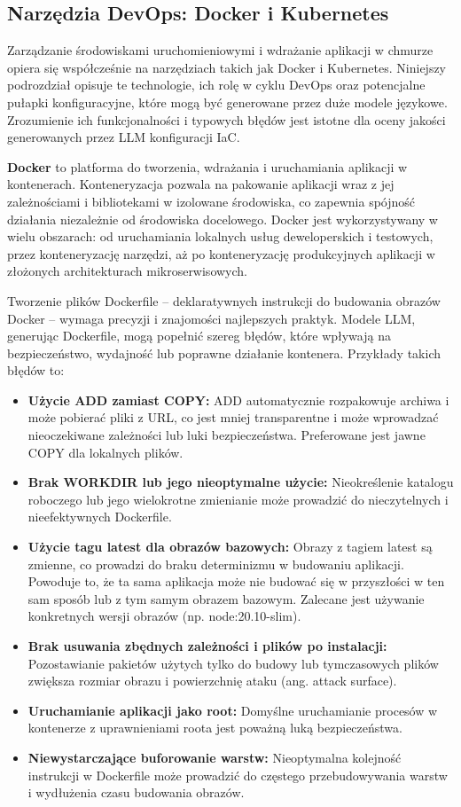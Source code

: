 \subsection{Narzędzia DevOps: Docker i Kubernetes}

Zarządzanie środowiskami uruchomieniowymi i wdrażanie aplikacji w chmurze opiera się współcześnie na narzędziach takich jak Docker i Kubernetes. Niniejszy podrozdział opisuje te technologie, ich rolę w cyklu DevOps oraz potencjalne pułapki konfiguracyjne, które mogą być generowane przez duże modele językowe. Zrozumienie ich funkcjonalności i typowych błędów jest istotne dla oceny jakości generowanych przez LLM konfiguracji IaC.

\textbf{Docker} to platforma do tworzenia, wdrażania i uruchamiania aplikacji w kontenerach. Konteneryzacja pozwala na pakowanie aplikacji wraz z jej zależnościami i bibliotekami w izolowane środowiska, co zapewnia spójność działania niezależnie od środowiska docelowego. Docker jest wykorzystywany w wielu obszarach: od uruchamiania lokalnych usług deweloperskich i testowych, przez konteneryzację narzędzi, aż po konteneryzację produkcyjnych aplikacji w złożonych architekturach mikroserwisowych.

Tworzenie plików Dockerfile – deklaratywnych instrukcji do budowania obrazów Docker – wymaga precyzji i znajomości najlepszych praktyk. Modele LLM, generując Dockerfile, mogą popełnić szereg błędów, które wpływają na bezpieczeństwo, wydajność lub poprawne działanie kontenera. Przykłady takich błędów to:
\begin{itemize}
\item \textbf{Użycie ADD zamiast COPY:} ADD automatycznie rozpakowuje archiwa i może pobierać pliki z URL, co jest mniej transparentne i może wprowadzać nieoczekiwane zależności lub luki bezpieczeństwa. Preferowane jest jawne COPY dla lokalnych plików.
\item \textbf{Brak WORKDIR lub jego nieoptymalne użycie:} Nieokreślenie katalogu roboczego lub jego wielokrotne zmienianie może prowadzić do nieczytelnych i nieefektywnych Dockerfile.
\item \textbf{Użycie tagu latest dla obrazów bazowych:} Obrazy z tagiem latest są zmienne, co prowadzi do braku determinizmu w budowaniu aplikacji. Powoduje to, że ta sama aplikacja może nie budować się w przyszłości w ten sam sposób lub z tym samym obrazem bazowym. Zalecane jest używanie konkretnych wersji obrazów (np. node:20.10-slim).
\item \textbf{Brak usuwania zbędnych zależności i plików po instalacji:} Pozostawianie pakietów użytych tylko do budowy lub tymczasowych plików zwiększa rozmiar obrazu i powierzchnię ataku (ang. attack surface).
\item \textbf{Uruchamianie aplikacji jako root:} Domyślne uruchamianie procesów w kontenerze z uprawnieniami roota jest poważną luką bezpieczeństwa.
\item \textbf{Niewystarczające buforowanie warstw:} Nieoptymalna kolejność instrukcji w Dockerfile może prowadzić do częstego przebudowywania warstw i wydłużenia czasu budowania obrazów.
\end{itemize}

